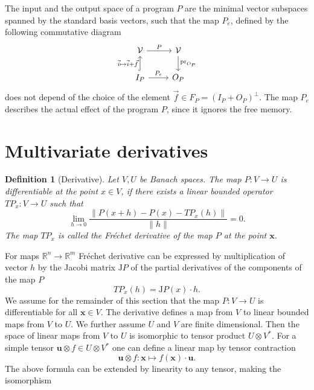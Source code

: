 \documentclass{article}
\newcommand{\RR}{\mathbb{R}}
\newcommand{\VV}{\mathcal{V}}
\newcommand{\x}{\mathbf{x}}
\newcommand{\uu}{\mathbf{u}}
\newtheorem{definicija}{Definition}[section]
\begin{document}
The input and the output space of a program $P$ are the minimal
vector subspaces spanned by the standard basis vectors, such that the map $P_e$, 
defined by the following commutative diagram 
\begin{equation} 
    \label{eq:induced_map}
\begin{tikzcd}
  \VV \arrow{r}{P} & 
  \VV \arrow{d}{\mathrm{pr}_{O_P}}\\
  I_P \arrow[hook]{u}{\vec{i}\mapsto \vec{i}+\vec{f}} 
  \arrow{r}{P_e}& O_P
\end{tikzcd}
  \end{equation}
does not depend of the choice of the element 
$\vec{f}\in F_P=(I_P+O_P)^\perp$. The map $P_e$ describes the actual effect of the
program $P$, since it ignores the free memory. 
\section{Multivariate derivatives}
\begin{definicija}[Derivative]
  Let $V,U$ be Banach spaces. The map $P:V\to U$ is differentiable at the point
  $x\in V$, if there exists a linear bounded operator $TP_x:V\to U$ such that
  \begin{equation}
    \label{eq:frechet}
    \lim_{h\to 0}\frac{\|P(x+h)-P(x)-TP_x(h)\|}{\|h\|} = 0.
  \end{equation}
  The map $TP_x$ is called the \emph{Fréchet derivative} of the map $P$ at the
  point $\x$.
\end{definicija}
For maps $\RR^n\to \RR^m$ Fréchet derivative can be expressed by multiplication
of vector $h$ by the Jacobi matrix $\mathrm{J} P$ of the  partial derivatives of the 
components of the map $P$
\begin{equation*}
  TP_x(h) = \mathrm{J} P(x)\cdot h.
\end{equation*}
We assume for the remainder of this section that the map $P:V\to U$ is
differentiable for all $\x\in V$. The derivative defines a map from $V$ to
linear bounded maps from $V$ to $U$. We further assume $U$ and $V$ are finite
dimensional. Then the space of linear maps from $V$ to $U$ is isomorphic to
tensor product $U\otimes V^*$. For a simple tensor $\uu\otimes f\in U\otimes
V^*$ one can define a linear map by tensor contraction 
 \begin{equation}
   \label{eq:lin_tenzor}
   \uu\otimes f:\x \mapsto f(\x)\cdot \uu.
 \end{equation}
The above formula can be extended by linearity to any tensor, making the isomorphism
\end{document}
